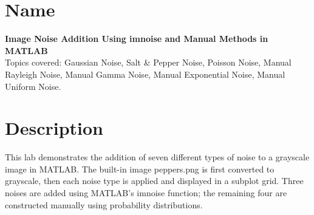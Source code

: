 \documentclass[12pt,a4paper]{article}
\begin{document}

\section{Name}

\textbf{Image Noise Addition Using imnoise and Manual Methods in MATLAB}\\[0.3em]
Topics covered: Gaussian Noise, Salt \& Pepper Noise, Poisson Noise,
Manual Rayleigh Noise, Manual Gamma Noise, Manual Exponential Noise,
Manual Uniform Noise.


\section{Description}

This lab demonstrates the addition of seven different types of noise to a
grayscale image in MATLAB. The built-in image peppers.png is first converted
to grayscale, then each noise type is applied and displayed in a subplot grid.
Three noises are added using MATLAB's imnoise function; the remaining four
are constructed manually using probability distributions.
\end{document}
